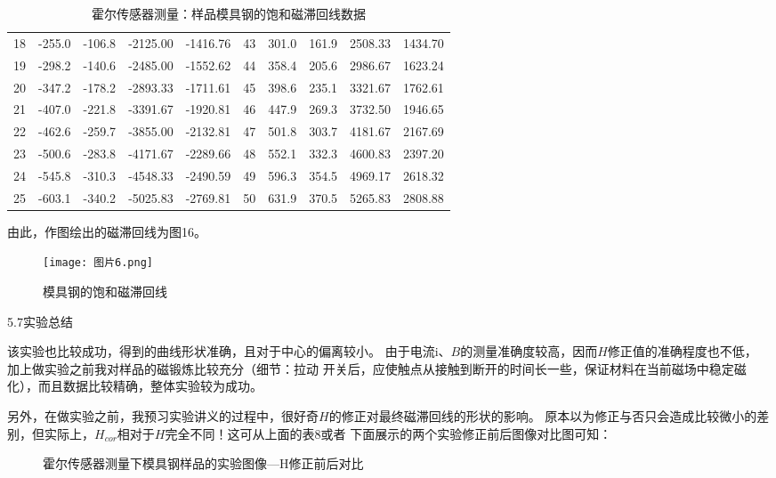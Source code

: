 \documentclass[11pt]{article}
\begin{document}
\begin{table}[!ht]
\begin{tabular}{ccccc|ccccc}
        18 & -255.0  & -106.8 & -2125.00  & -1416.76  & 43 & 301.0 & 161.9 & 2508.33  & 1434.70  \\ 
        19 & -298.2 & -140.6 & -2485.00  & -1552.62  & 44 & 358.4 & 205.6 & 2986.67  & 1623.24  \\ 
        20 & -347.2 & -178.2 & -2893.33  & -1711.61  & 45 & 398.6 & 235.1 & 3321.67  & 1762.61  \\ 
        21 & -407.0  & -221.8 & -3391.67  & -1920.81  & 46 & 447.9 & 269.3 & 3732.50  & 1946.65  \\ 
        22 & -462.6 & -259.7 & -3855.00  & -2132.81  & 47 & 501.8 & 303.7 & 4181.67  & 2167.69  \\ 
        23 & -500.6 & -283.8 & -4171.67  & -2289.66  & 48 & 552.1 & 332.3 & 4600.83  & 2397.20  \\ 
        24 & -545.8 & -310.3 & -4548.33  & -2490.59  & 49 & 596.3 & 354.5 & 4969.17  & 2618.32  \\ 
        25 & -603.1 & -340.2 & -5025.83  & -2769.81  & 50 & 631.9 & 370.5 & 5265.83  & 2808.88 \\ 
        \bottomrule
    \end{tabular}
    \caption{霍尔传感器测量：样品模具钢的饱和磁滞回线数据}
\end{table}

由此，作图绘出的磁滞回线为图16。

\begin{figure}[H]
    \centering
    \texttt{[image: 图片6.png]}
    \caption{模具钢的饱和磁滞回线}
\end{figure}

\begin{center}
    \large{5.7实验总结}
\end{center}

该实验也比较成功，得到的曲线形状准确，且对于中心的偏离较小。
由于电流i、$B$的测量准确度较高，因而$H$修正值的准确程度也不低，
加上做实验之前我对样品的磁锻炼比较充分（细节：拉动
开关后，应使触点从接触到断开的时间长一些，保证材料在当前磁场中稳定磁化），而且数据比较精确，整体实验较为成功。

另外，在做实验之前，我预习实验讲义的过程中，很好奇$H$的修正对最终磁滞回线的形状的影响。
原本以为修正与否只会造成比较微小的差别，但实际上，$H_{cor}$相对于$H$完全不同！这可从上面的表8或者
下面展示的两个实验修正前后图像对比图可知：


\begin{figure}[H]
    \centering
    \caption{霍尔传感器测量下模具钢样品的实验图像—H修正前后对比}
\end{figure}
\end{document}
